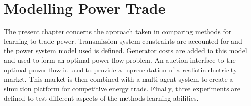 \chapter{Modelling Power Trade}
\label{ch:method}
The present chapter concerns the approach taken in comparing methods for
learning to trade power.  Transmission system constraints are accounted for and
the power system model used is defined.  Generator costs are added to this
model and used to form an optimal power flow problem.  An auction interface to
the optimal power flow is used to provide a representation of a realistic
electricity market.  This market is then combined with a multi-agent system to
create a simultion platform for competitive energy trade.  Finally, three
experiments are defined to test different aspects of the methods learning
abilities.

